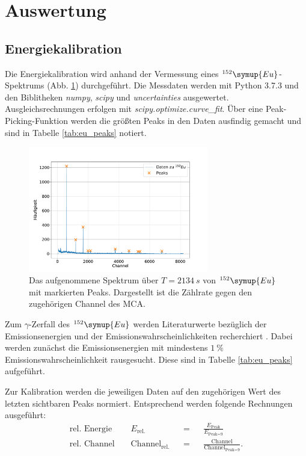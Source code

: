 \section{Auswertung}
\subsection{Energiekalibration}
Die Energiekalibration wird anhand der Vermessung eines $^{152}\symup{Eu}$-Spektrums (Abb. \ref{fig:eu_spectrum}) durchgeführt.
Die Messdaten werden mit Python 3.7.3 und den Biblitheken \textit{numpy}, \textit{scipy} und \textit{uncertainties} ausgewertet.
Ausgleichsrechnungen erfolgen mit \textit{scipy.optimize.curve\_fit}.
Über eine Peak-Picking-Funktion werden die größten Peaks in den Daten ausfindig gemacht und sind in Tabelle \ref{tab:eu_peaks} notiert.
\begin{figure}[h!]
  \centering
  \includegraphics[width=0.7\textwidth]{content/images/spektrum_europium.pdf}
  \caption{Das aufgenommene Spektrum über $T=\SI{2134}{s}$ von $^{152}\symup{Eu}$ mit markierten Peaks. Dargestellt ist die Zählrate gegen den zugehörigen Channel des MCA.}
  \label{fig:eu_spectrum}
\end{figure}
Zum $\gamma$-Zerfall des $^{152}\symup{Eu}$ werden Literaturwerte bezüglich der Emissionsenergien und der Emissionswahrscheinlichkeiten recherchiert \cite{nucleide}.
Dabei werden zunächst die Emissionsenergien mit mindestens $\SI{1}{\%}$ Emissionswahrscheinlichkeit rausgesucht.
Diese sind in Tabelle \ref{tab:eu_peaks} aufgeführt.

Zur Kalibration werden die jeweiligen Daten auf den zugehörigen Wert des letzten sichtbaren Peaks normiert.
Entsprechend werden folgende Rechnungen ausgeführt:
\begin{align*}
	\text{rel. Energie } && E_{\text{rel.}} 				&& = && \frac{ E_{\text{Peak}} }{ E_{\text{Peak=9}} } \\
	\text{rel. Channel } && \text{Channel}_{\text{rel.}} 	&& = && \frac{ \text{Channel} }{ \text{Channel}_{\text{Peak=9}} }. \\
\end{align*}
